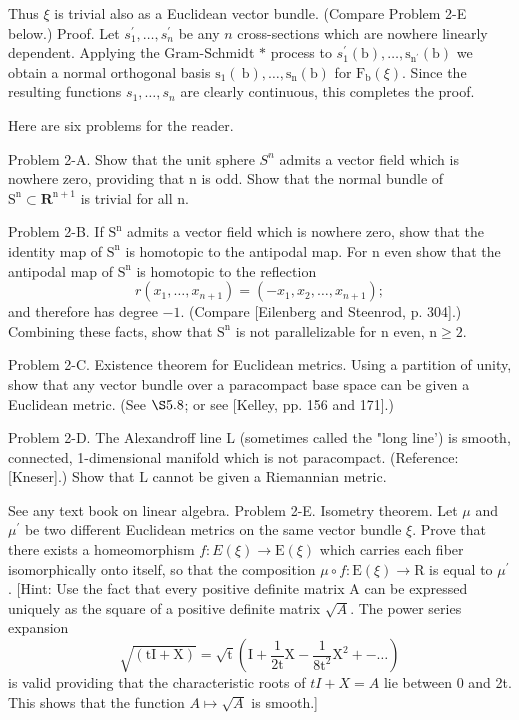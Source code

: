 \documentclass[10pt]{article}
\begin{document}
Thus $\xi$ is trivial also as a Euclidean vector bundle. (Compare Problem 2-E below.) Proof. Let $s_{1}^{\prime}, \ldots, s_{n}^{\prime}$ be any $n$ cross-sections which are nowhere linearly dependent. Applying the Gram-Schmidt $*$ process to $s_{1}^{\prime}(\mathrm{b}), \ldots, \mathrm{s}_{\mathrm{n}^{\prime}}(\mathrm{b})$ we obtain a normal orthogonal basis $\mathrm{s}_{1}(\mathrm{~b}), \ldots, \mathrm{s}_{\mathrm{n}}(\mathrm{b})$ for $\mathrm{F}_{\mathrm{b}}(\xi)$. Since the resulting functions $s_{1}, \ldots, s_{n}$ are clearly continuous, this completes the proof.

Here are six problems for the reader.

Problem 2-A. Show that the unit sphere $S^{n}$ admits a vector field which is nowhere zero, providing that $\mathrm{n}$ is odd. Show that the normal bundle of $\mathrm{S}^{\mathrm{n}} \subset \mathbf{R}^{\mathrm{n}+1}$ is trivial for all $\mathrm{n}$.

Problem 2-B. If $\mathrm{S}^{\mathrm{n}}$ admits a vector field which is nowhere zero, show that the identity map of $\mathrm{S}^{\mathrm{n}}$ is homotopic to the antipodal map. For $\mathrm{n}$ even show that the antipodal map of $\mathrm{S}^{\mathrm{n}}$ is homotopic to the reflection
$$
r\left(x_{1}, \ldots, x_{n+1}\right)=\left(-x_{1}, x_{2}, \ldots, x_{n+1}\right) ;
$$
and therefore has degree $-1$. (Compare [Eilenberg and Steenrod, p. 304].) Combining these facts, show that $\mathrm{S}^{\mathrm{n}}$ is not parallelizable for $\mathrm{n}$ even, $\mathrm{n} \geq 2$.

Problem 2-C. Existence theorem for Euclidean metrics. Using a partition of unity, show that any vector bundle over a paracompact base space can be given a Euclidean metric. (See $\S 5.8$; or see [Kelley, pp. 156 and 171].)

Problem 2-D. The Alexandroff line L (sometimes called the "long line') is smooth, connected, 1-dimensional manifold which is not paracompact. (Reference: [Kneser].) Show that $\mathrm{L}$ cannot be given a Riemannian metric.

See any text book on linear algebra. Problem 2-E. Isometry theorem. Let $\mu$ and $\mu^{\prime}$ be two different Euclidean metrics on the same vector bundle $\xi$. Prove that there exists a homeomorphism $f: E(\xi) \rightarrow \mathrm{E}(\xi)$ which carries each fiber isomorphically onto itself, so that the composition $\mu \circ f: \mathrm{E}(\xi) \rightarrow \mathrm{R}$ is equal to $\mu^{\prime}$. [Hint: Use the fact that every positive definite matrix A can be expressed uniquely as the square of a positive definite matrix $\sqrt{A}$. The power series expansion
$$
\sqrt{(\mathrm{tI}+\mathrm{X})}=\sqrt{\mathrm{t}}\left(\mathrm{I}+\frac{1}{2 \mathrm{t}} \mathrm{X}-\frac{1}{8 \mathrm{t}^{2}} \mathrm{X}^{2}+-\ldots\right)
$$
is valid providing that the characteristic roots of $t I+X=A$ lie between 0 and 2t. This shows that the function $A \mapsto \sqrt{A}$ is smooth.]
\end{document}
